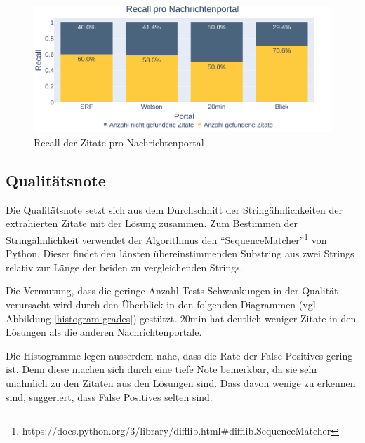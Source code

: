 \begin{figure}[H]
	\begin{center}
        \centering
		\includegraphics[width=1.0\linewidth]{./images/recall_portals.png}
	\end{center}
	\caption{Recall der Zitate pro Nachrichtenportal}
	\label{barchart-recall}
\end{figure}

\subsection{Qualitätsnote}\label{quality-grade}

Die Qualitätsnote setzt sich aus dem Durchschnitt der Stringähnlichkeiten der extrahierten Zitate
mit der Lösung zusammen. Zum Bestimmen der Stringähnlichkeit verwendet der Algorithmus den
\enquote{SequenceMatcher}\footnote{https://docs.python.org/3/library/difflib.html\#difflib.SequenceMatcher} von Python.
Dieser findet den länsten übereinstimmenden Substring aus zwei Strings relativ zur
Länge der beiden zu vergleichenden Strings.

Die Vermutung, dass die geringe Anzahl Tests Schwankungen in der Qualität verursacht
wird durch den Überblick in den folgenden Diagrammen (vgl. Abbildung \ref{histogram-grades}) gestützt.
20min hat deutlich weniger Zitate in den Lösungen als die anderen Nachrichtenportale.

Die Histogramme legen ausserdem nahe, dass die Rate der False-Positives gering ist.
Denn diese machen sich durch eine tiefe Note bemerkbar, da sie sehr unähnlich zu den Zitaten
aus den Lösungen sind. Dass davon wenige zu erkennen sind, suggeriert, dass False Positives
selten sind.

